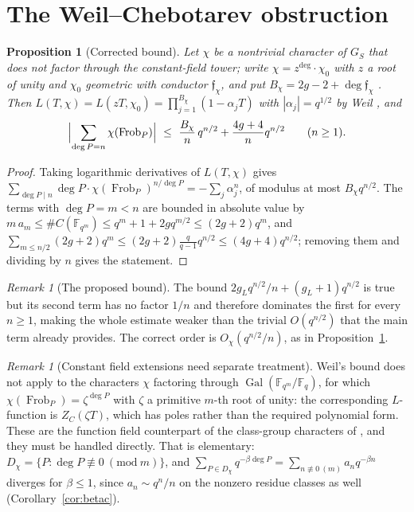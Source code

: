 \documentclass[11pt]{amsart}
\numberwithin{equation}{section}
\newtheorem{proposition}[theorem]{Proposition}
\theoremstyle{definition}
\theoremstyle{remark}
\newtheorem{remark}[theorem]{Remark}
\newcommand{\F}{\mathbb{F}}
\newcommand{\ff}{\mathfrak{f}}
\newcommand{\Frob}{\operatorname{Frob}}
\newcommand{\Gal}{\operatorname{Gal}}
\begin{document}
\section{The Weil--Chebotarev obstruction}

\begin{proposition}[Corrected bound]\label{prop:weilbound}
Let $\chi$ be a nontrivial character of $G_S$ that does \emph{not} factor through the
constant-field tower; write $\chi=z^{\deg}\cdot\chi_0$ with $z$ a root of unity and $\chi_0$
geometric with conductor $\ff_\chi$, and put $B_\chi=2g-2+\deg\ff_\chi$
\cite{Stichtenoth}. Then $L(T,\chi)=L(zT,\chi_0)=\prod_{j=1}^{B_\chi}(1-\alpha_jT)$ with
$|\alpha_j|=q^{1/2}$ by Weil \cite{Weil}, and
\[
\Bigl|\sum_{\deg P=n}\chi(\Frob_P)\Bigr|\ \le\ \frac{B_\chi}{n}\,q^{n/2}+\frac{4g+4}{n}q^{n/2}
\qquad(n\ge1).
\]
\end{proposition}

\begin{proof}
Taking logarithmic derivatives of $L(T,\chi)$ gives
$\sum_{\deg P\mid n}\deg P\cdot\chi(\Frob_P)^{n/\deg P}=-\sum_j\alpha_j^n$, of modulus at
most $B_\chi q^{n/2}$. The terms with $\deg P=m<n$ are bounded in absolute value by
$m\,a_m\le\#C(\F_{q^m})\le q^m+1+2gq^{m/2}\le(2g+2)q^m$, and
$\sum_{m\le n/2}(2g+2)q^m\le(2g+2)\tfrac{q}{q-1}q^{n/2}\le(4g+4)q^{n/2}$; removing them and
dividing by $n$ gives the statement.
\end{proof}

\begin{remark}[The proposed bound]\label{rem:proposedbound}
The bound $2g_Lq^{n/2}/n+(g_L+1)q^{n/2}$ is true but its second term has no factor $1/n$ and
therefore dominates the first for every $n\ge1$, making the whole estimate weaker than the
trivial $O(q^{n/2})$ that the main term already provides. The correct order is
$O_\chi(q^{n/2}/n)$, as in Proposition~\ref{prop:weilbound}.
\end{remark}

\begin{remark}[Constant field extensions need separate treatment]\label{rem:constfield}
Weil's bound does not apply to the characters $\chi$ factoring through
$\Gal(\F_{q^m}/\F_q)$, for which $\chi(\Frob_P)=\zeta^{\deg P}$ with $\zeta$ a primitive
$m$-th root of unity: the corresponding $L$-function is $Z_C(\zeta T)$, which has poles
rather than the required polynomial form. These are the function field counterpart of the
class-group characters of \cite[\S4.1]{Main}, and they must be handled directly. That is
elementary: $D_\chi=\{P:\deg P\not\equiv0\ (\mathrm{mod}\ m)\}$, and
$\sum_{P\in D_\chi}q^{-\beta\deg P}=\sum_{n\not\equiv0\ (m)}a_nq^{-\beta n}$ diverges for
$\beta\le1$, since $a_n\sim q^n/n$ on the nonzero residue classes as well
(Corollary~\ref{cor:betac}).
\end{remark}
\end{document}

